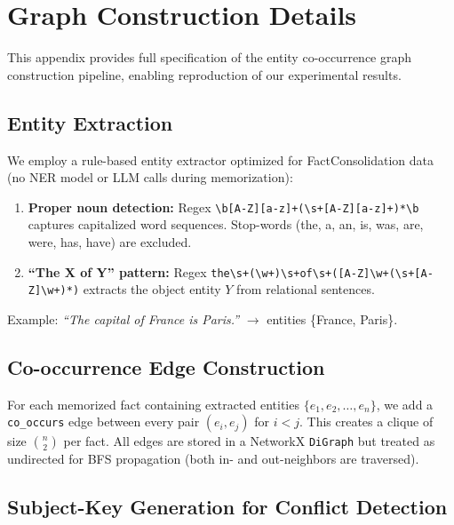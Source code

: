 \documentclass[11pt]{article}
\begin{document}
\section{Graph Construction Details}
\label{app:graph_construction}

This appendix provides full specification of the entity co-occurrence graph construction pipeline, enabling reproduction of our experimental results.

\subsection{Entity Extraction}

We employ a rule-based entity extractor optimized for FactConsolidation data (no NER model or LLM calls during memorization):

\begin{enumerate}
\item \textbf{Proper noun detection:} Regex \texttt{\textbackslash b[A-Z][a-z]+(\textbackslash s+[A-Z][a-z]+)*\textbackslash b} captures capitalized word sequences. Stop-words (the, a, an, is, was, are, were, has, have) are excluded.
\item \textbf{``The X of Y'' pattern:} Regex \texttt{the\textbackslash s+(\textbackslash w+)\textbackslash s+of\textbackslash s+([A-Z]\textbackslash w+(\textbackslash s+[A-Z]\textbackslash w+)*)} extracts the object entity $Y$ from relational sentences.
\end{enumerate}

\noindent Example: \textit{``The capital of France is Paris.''} $\rightarrow$ entities \{France, Paris\}.

\subsection{Co-occurrence Edge Construction}

For each memorized fact containing extracted entities $\{e_1, e_2, \ldots, e_n\}$, we add a \texttt{co\_occurs} edge between every pair $(e_i, e_j)$ for $i < j$. This creates a clique of size $\binom{n}{2}$ per fact. All edges are stored in a NetworkX \texttt{DiGraph} but treated as undirected for BFS propagation (both in- and out-neighbors are traversed).

\subsection{Subject-Key Generation for Conflict Detection}
\end{document}
